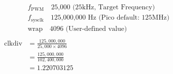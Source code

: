 \begin{align*}
& f_{\mathrm{PWM}} \quad \text{25,000 (25kHz, Target Frequency)} \\
& f_{\mathrm{sysclk}} \quad \text{125,000,000 Hz (Pico default: 125MHz)} \\
& \mathrm{wrap}    \quad \text{4096 (User-defined value)} \\
\\
\mathrm{clkdiv} &= \frac{125,000,000}{25,000 \times 4096} \\
&= \frac{125,000,000}{102,400,000} \\
&= 1.220703125
\end{align*}